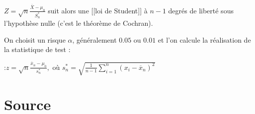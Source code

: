$ Z = \sqrt{n}\frac{\overline{X} - \mu_0}{S^{\ast}_n}$
suit alors une [[loi de Student]] à $n-1$ degrés de liberté sous l'hypothèse nulle (c'est le théorème de Cochran).

On choisit un risque $\alpha$, généralement $0.05$ ou $0.01$ et l'on calcule la réalisation de la statistique de test :

:$z = \sqrt{n}\frac{\overline{x}_n - \mu_0}{s^{\ast}_n},$ où $s^{\ast}_n =\sqrt{\frac{1}{n-1}\sum\limits_{i=1}^n (x_i - \overline x_n )^2} $






\chapter{Source}